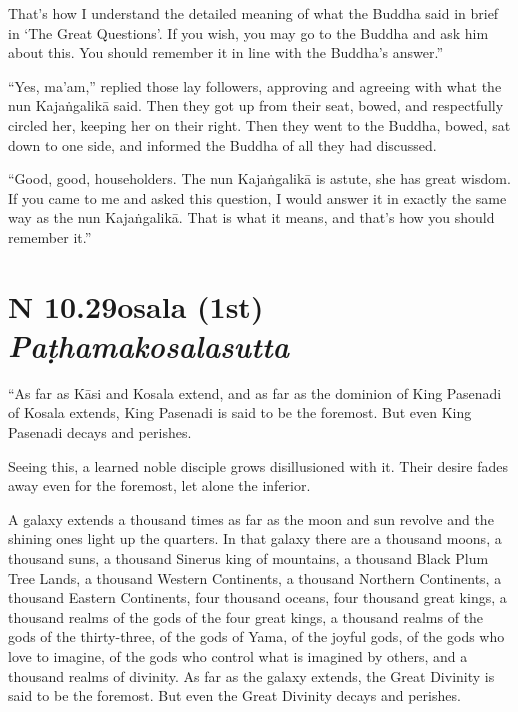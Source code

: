 \documentclass[12pt,openany]{book}%
\newcommand*{\suttatitleacronym}[1]{\smaller[2]{#1}\vspace*{.3em}}
\newcommand*{\suttatitletranslation}[1]{\linebreak{#1}}
\newcommand*{\suttatitleroot}[1]{\linebreak\smaller[2]\itshape{#1}}
\newcommand*{\tocacronym}[1]{\hspace*{-3.3em}{#1}\quad}
\newcommand*{\toctranslation}[1]{#1}
\newcommand*{\tocroot}[1]{(\textit{#1})}
\begin{document}
That’s how I understand the detailed meaning of what the Buddha said in brief in ‘The Great Questions’. If you wish, you may go to the Buddha and ask him about this. You should remember it in line with the Buddha’s answer.” 

“Yes, ma’am,” replied those lay followers, approving and agreeing with what the nun \textsanskrit{Kajaṅgalikā} said. Then they got up from their seat, bowed, and respectfully circled her, keeping her on their right. Then they went to the Buddha, bowed, sat down to one side, and informed the Buddha of all they had discussed. 

“Good, good, householders. The nun \textsanskrit{Kajaṅgalikā} is astute, she has great wisdom. If you came to me and asked this question, I would answer it in exactly the same way as the nun \textsanskrit{Kajaṅgalikā}. That is what it means, and that’s how you should remember it.” 

%
\section*{{\suttatitleacronym AN 10.29}{\suttatitletranslation Kosala (1st) }{\suttatitleroot Paṭhamakosalasutta}}
\addcontentsline{toc}{section}{\tocacronym{AN 10.29} \toctranslation{Kosala (1st) } \tocroot{Paṭhamakosalasutta}}

“As far as \textsanskrit{Kāsi} and Kosala extend, and as far as the dominion of King Pasenadi of Kosala extends, King Pasenadi is said to be the foremost. But even King Pasenadi decays and perishes. 

Seeing this, a learned noble disciple grows disillusioned with it. Their desire fades away even for the foremost, let alone the inferior. 

A galaxy extends a thousand times as far as the moon and sun revolve and the shining ones light up the quarters. In that galaxy there are a thousand moons, a thousand suns, a thousand Sinerus king of mountains, a thousand Black Plum Tree Lands, a thousand Western Continents, a thousand Northern Continents, a thousand Eastern Continents, four thousand oceans, four thousand great kings, a thousand realms of the gods of the four great kings, a thousand realms of the gods of the thirty-three, of the gods of Yama, of the joyful gods, of the gods who love to imagine, of the gods who control what is imagined by others, and a thousand realms of divinity. As far as the galaxy extends, the Great Divinity is said to be the foremost. But even the Great Divinity decays and perishes. 
\end{document}
